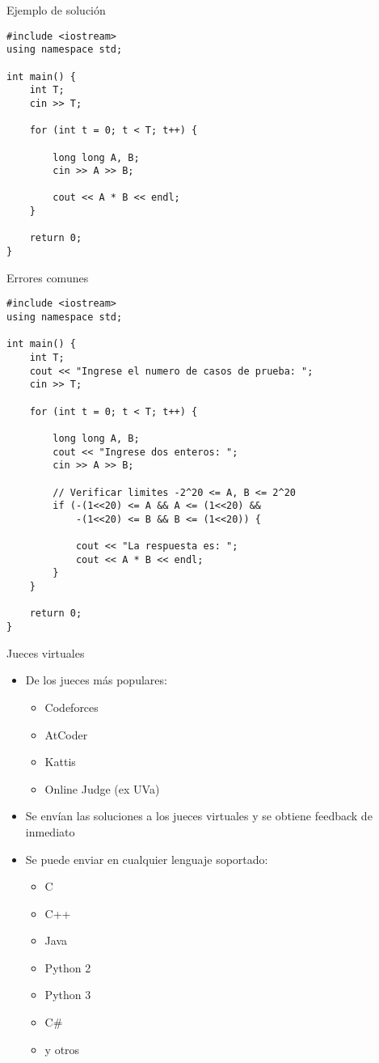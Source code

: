 \documentclass[10pt]{beamer}
\newcommand{\bi}{\begin{itemize}}
\newcommand{\ei}{\end{itemize}}
\begin{document}
\begin{frame}[fragile]{Ejemplo de solución}
    \begin{verbatim}
#include <iostream>
using namespace std;

int main() {
    int T;
    cin >> T;

    for (int t = 0; t < T; t++) {

        long long A, B;
        cin >> A >> B;

        cout << A * B << endl;
    }

    return 0;
}
\end{verbatim}

    \bi
    \ei
\end{frame}

\begin{frame}[fragile]{Errores comunes}
    \begin{verbatim}
#include <iostream>
using namespace std;

int main() {
    int T;
    cout << "Ingrese el numero de casos de prueba: ";
    cin >> T;

    for (int t = 0; t < T; t++) {

        long long A, B;
        cout << "Ingrese dos enteros: ";
        cin >> A >> B;

        // Verificar limites -2^20 <= A, B <= 2^20
        if (-(1<<20) <= A && A <= (1<<20) &&
            -(1<<20) <= B && B <= (1<<20)) {

            cout << "La respuesta es: "; 
            cout << A * B << endl;
        }
    }

    return 0;
}
\end{verbatim}

\end{frame}

\begin{frame}{Jueces virtuales}
    \bi
        \item De los jueces más populares:
        \bi
            \item \alert{Codeforces}
            \item \alert{AtCoder}
            \item \alert{Kattis}
            \item \alert{Online Judge (ex UVa)}
        \ei
        \item Se envían las soluciones a los jueces virtuales y se obtiene feedback de inmediato
        \item Se puede enviar en cualquier lenguaje soportado:
            \bi
                \item C
                \item C++
                \item Java
                \item Python 2
                \item Python 3
                \item C\#{}
                \item y otros
            \ei
    \ei
\end{frame}
\end{document}
